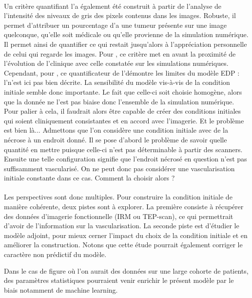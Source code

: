 \documentclass[main.tex]{subfiles}
\begin{document}
\paragraph{}
Un critère quantifiant l'\hetero a également été construit à partir de l'analyse de l'intensité des niveaux de gris des pixels contenus dans les images. Robuste, il permet d'attribuer un pourcentage d'\hetero a une tumeur présente sur une image quelconque, qu'elle soit médicale ou qu'elle provienne  de la simulation numérique. Il permet ainsi de quantifier ce qui restait jusqu'alors à l'appréciation personnelle de celui qui regarde les images. Pour \Nber, ce critère met en avant la proximité de l'évolution de l'\hetero clinique avec celle constatée sur les simulations numériques. Cependant, pour \Chen, ce quantificateur de l'\hetero démontre les limites du modèle EDP : l'\hetero n'est ici pas bien décrite. La sensibilité du modèle vis-à-vis de la condition initiale semble donc importante. Le fait que celle-ci soit choisie  homogène, alors que la donnée ne l'est pas biaise donc l'ensemble de la simulation numérique. Pour palier à cela, il faudrait alors être capable de créer des conditions initiales qui soient cliniquement consistantes et en accord avec l'imagerie. Et le problème est bien là... Admettons que l'on considère une condition initiale avec de la nécrose à un endroit donné. Il se pose d'abord le problème de savoir quelle quantité en mettre puisque celle-ci n'est pas déterminable à partir des scanners. Ensuite une telle configuration  signifie que l'endroit nécrosé en question n'est pas suffisamment vascularisé. On ne peut donc pas considérer une vascularisation initiale constante dans ce cas. Comment la choisir alors ?


\paragraph{}
Les perspectives sont donc multiples. 
Pour construire la condition initiale de manière cohérente, deux pistes sont à explorer. La première consiste à récupérer des données d'imagerie fonctionnelle (IRM ou TEP-scan), ce qui permettrait d'avoir de l'information sur la vascularisation. La seconde piste est d'étudier le modèle adjoint, pour mieux cerner l'impact du choix de la condition initiale et en améliorer la construction.  
Notons que cette étude pourrait également corriger le caractère non prédictif du modèle. 

Dans le cas de figure où l'on aurait des données sur une large cohorte de patients, des paramètres statistiques pourraient venir enrichir le présent modèle par le biais notamment de machine learning.
\end{document}
